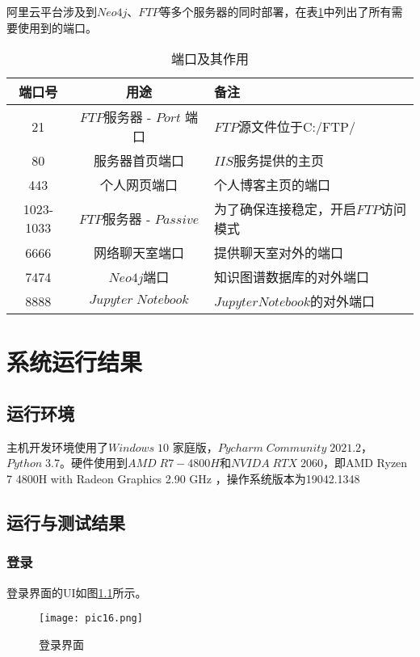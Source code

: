 \documentclass[forprint]{sql}
\begin{document}
阿里云平台涉及到$Neo4j$、$FTP$等多个服务器的同时部署，在表\ref{table:4}中列出了所有需要使用到的端口。

\begin{table}[ht]
	\caption{端口及其作用}
	\label{table:4}
	\begin{tabular}{ccl}
		\hline
		端口号 & 用途     & 备注                         \\ \hline
		21  & $FTP$服务器 - $Port$ 端口   & $FTP$源文件位于C:/FTP/   \\
		80   & 服务器首页端口   & $IIS$服务提供的主页  \\
		443   & 个人网页端口   & 个人博客主页的端口  \\
		1023-1033   & $FTP$服务器 - $Passive$& 为了确保连接稳定，开启$FTP$访问模式  \\
		6666   & 网络聊天室端口   & 提供聊天室对外的端口  \\
		7474   & $Neo4j$端口 & 知识图谱数据库的对外端口        \\
		8888   & $Jupyter \; Notebook$   & $Jupyter Notebook$的对外端口 \\ \hline
	\end{tabular}
\end{table}

\chapter{系统运行结果}

\section{运行环境}

主机开发环境使用了$ Windows \; 10 $ 家庭版，$ Pycharm \; Community \; 2021.2 $，$ Python \; 3.7 $。硬件使用到$ AMD \; R7-4800H $和$ NVIDA \; RTX \; 2060 $，即AMD Ryzen 7 4800H with Radeon Graphics 2.90 GHz
，操作系统版本为19042.1348

\section{运行与测试结果}

\subsection{登录}

登录界面的UI如图\ref{fig:16}所示。

\begin{figure}[!htbp]
	\centering
	\texttt{[image: pic16.png]}
	\caption{登录界面}
	\label{fig:16}
\end{figure}
\end{document}

